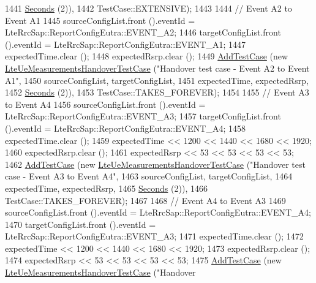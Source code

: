 \begin{DoxyCode}
1441                                                       \hyperlink{group__timecivil_ga33c34b816f8ff6628e33d5c8e9713b9e}{Seconds} (2)),
1442                TestCase::EXTENSIVE);
1443 
1444   \textcolor{comment}{// Event A2 to Event A1}
1445   sourceConfigList.front ().eventId = LteRrcSap::ReportConfigEutra::EVENT\_A2;
1446   targetConfigList.front ().eventId = LteRrcSap::ReportConfigEutra::EVENT\_A1;
1447   expectedTime.clear ();
1448   expectedRsrp.clear ();
1449   \hyperlink{classns3_1_1TestCase_a3718088e3eefd5d6454569d2e0ddd835}{AddTestCase} (\textcolor{keyword}{new} \hyperlink{classLteUeMeasurementsHandoverTestCase}{LteUeMeasurementsHandoverTestCase} (\textcolor{stringliteral}{"Handover
       test case - Event A2 to Event A1"},
1450                                                       sourceConfigList, targetConfigList,
1451                                                       expectedTime, expectedRsrp,
1452                                                       \hyperlink{group__timecivil_ga33c34b816f8ff6628e33d5c8e9713b9e}{Seconds} (2)),
1453                TestCase::TAKES\_FOREVER);
1454 
1455   \textcolor{comment}{// Event A3 to Event A4}
1456   sourceConfigList.front ().eventId = LteRrcSap::ReportConfigEutra::EVENT\_A3;
1457   targetConfigList.front ().eventId = LteRrcSap::ReportConfigEutra::EVENT\_A4;
1458   expectedTime.clear ();
1459   expectedTime << 1200 << 1440 << 1680 << 1920;
1460   expectedRsrp.clear ();
1461   expectedRsrp << 53 << 53 << 53 << 53;
1462   \hyperlink{classns3_1_1TestCase_a3718088e3eefd5d6454569d2e0ddd835}{AddTestCase} (\textcolor{keyword}{new} \hyperlink{classLteUeMeasurementsHandoverTestCase}{LteUeMeasurementsHandoverTestCase} (\textcolor{stringliteral}{"Handover
       test case - Event A3 to Event A4"},
1463                                                       sourceConfigList, targetConfigList,
1464                                                       expectedTime, expectedRsrp,
1465                                                       \hyperlink{group__timecivil_ga33c34b816f8ff6628e33d5c8e9713b9e}{Seconds} (2)),
1466                TestCase::TAKES\_FOREVER);
1467 
1468   \textcolor{comment}{// Event A4 to Event A3}
1469   sourceConfigList.front ().eventId = LteRrcSap::ReportConfigEutra::EVENT\_A4;
1470   targetConfigList.front ().eventId = LteRrcSap::ReportConfigEutra::EVENT\_A3;
1471   expectedTime.clear ();
1472   expectedTime << 1200 << 1440 << 1680 << 1920;
1473   expectedRsrp.clear ();
1474   expectedRsrp << 53 << 53 << 53 << 53;
1475   \hyperlink{classns3_1_1TestCase_a3718088e3eefd5d6454569d2e0ddd835}{AddTestCase} (\textcolor{keyword}{new} \hyperlink{classLteUeMeasurementsHandoverTestCase}{LteUeMeasurementsHandoverTestCase} (\textcolor{stringliteral}{"Handover
}
\end{DoxyCode}
